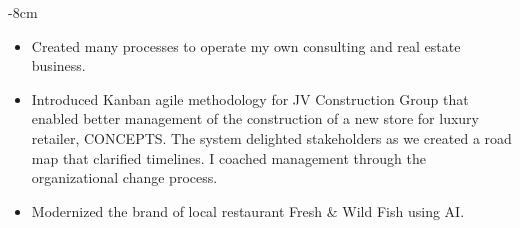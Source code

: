 \documentclass[10pt,a4paper]{altacv}
\begin{document}
\tagline{}


\begin{adjustwidth}{}{-8cm}
\makecvheader
\end{adjustwidth}

\begin{itemize}
\item Created many processes to operate my own consulting and real estate business.
\item Introduced Kanban agile methodology for JV Construction Group that enabled better management of the construction of a new store for luxury retailer, CONCEPTS. The system delighted stakeholders as we created a road map that clarified timelines. I coached management through the organizational change process.
\item Modernized the brand of local restaurant Fresh \& Wild Fish using AI.

\end{itemize}
\divider
\end{document}
